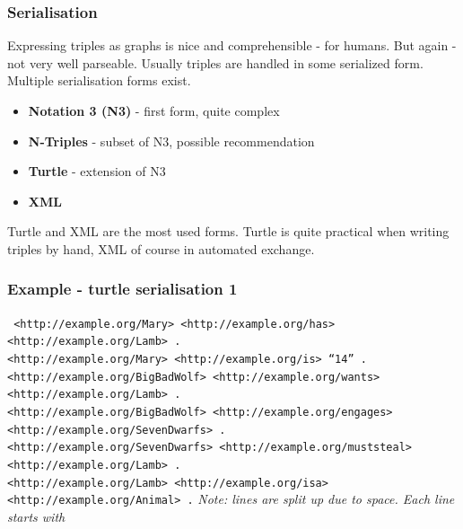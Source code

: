 \documentclass{beamer}
\begin{document}
        \begin{frame}
            \frametitle{Serialisation}

            Expressing triples as graphs is nice and comprehensible - for humans.
            But again - not very well parseable. Usually triples are handled in
            some serialized form. Multiple serialisation forms exist.
            \vskip 0.7cm
            \pause

            \begin{itemize}
                \item \textbf{Notation 3 (N3)} - first form, quite complex
                \pause
                \item \textbf{N-Triples} - subset of N3, possible recommendation
                \pause
                \item \textbf{Turtle} - extension of N3
                \pause
                \item \textbf{XML}
                \pause
           \end{itemize}
           \vskip 0.7cm
           Turtle and XML are the most used forms. Turtle is quite practical when writing
           triples by hand, XML of course in automated exchange.
       \end{frame}

       \begin{frame}
           \frametitle{Example - turtle serialisation 1}
           \footnotesize
           \texttt{ <http://example.org/Mary>    <http://example.org/has>    <http://example.org/Lamb>  .\\
            <http://example.org/Mary>    <http://example.org/is>     ``14''  .\\
            <http://example.org/BigBadWolf>    <http://example.org/wants>   <http://example.org/Lamb>  .\\
            <http://example.org/BigBadWolf>    <http://example.org/engages>    <http://example.org/SevenDwarfs>  .\\
            <http://example.org/SevenDwarfs>    <http://example.org/muststeal>    <http://example.org/Lamb>  .\\
            <http://example.org/Lamb>    <http://example.org/isa>    <http://example.org/Animal>  .}
           \normalsize
           \vskip 0.7cm
           \textit{Note: lines are split up due to space. Each line starts with }
       \end{frame}
\end{document}
